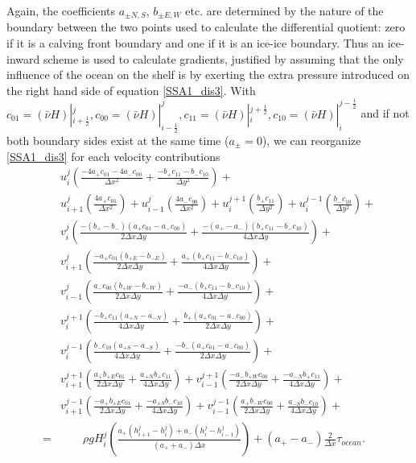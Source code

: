 \documentclass[a4paper,10pt]{article}
\begin{document}
Again, the coefficients $a_{\pm N,S}$, $b_{\pm E,W}$ etc. are determined by the nature of the boundary between the two points used to calculate the differential quotient: zero if it is a calving front boundary and one if it is an ice-ice boundary. Thus an ice-inward scheme is used to calculate gradients, justified by assuming that the only influence of the ocean on the shelf is by exerting the extra pressure introduced on the right hand side of equation \eqref{SSA1_dis3}.\newline
\newline
With $c_{01}=(\bar{\nu}H)|_{i+\frac{1}{2}}^j, c_{00}=(\bar{\nu}H)|_{i-\frac{1}{2}}^j, c_{11}=(\bar{\nu}H)|_{i}^{j+\frac{1}{2}}, c_{10}=(\bar{\nu}H)|_{i}^{j-\frac{1}{2}}$ and if not both boundary sides exist at the same time ($a_{\pm}=0$), we can reorganize \eqref{SSA1_dis3} for each velocity contributions
\begin{align}
& u_{i}^{j}\left(\frac{-4a_+c_{01}-4a_-c_{00}}{\Delta x^2}+\frac{-b_+c_{11}-b_-c_{10}}{\Delta y^2}\right)+ \nonumber \\
& u_{i+1}^{j}\left(\frac{4a_+c_{01}}{\Delta x^2}\right)+u_{i-1}^{j}\left(\frac{4a_-c_{00}}{\Delta x^2}\right)+u_{i}^{j+1}\left(\frac{b_+c_{11}}{\Delta y^2}\right)+u_{i}^{j-1}\left(\frac{b_-c_{10}}{\Delta y^2}\right)+ \nonumber \\
& v_{i}^{j}\left(\frac{-(b_+-b_-)(a_+ c_{01}-a_- c_{00})}{2 \Delta x \Delta y}+\frac{-(a_+-a_-)(b_+ c_{11}-b_- c_{10})}{4 \Delta x \Delta y}\right)+ \nonumber \\
& v_{i+1}^{j}\left(\frac{-a_+ c_{01} (b_{+E}-b_{-E})}{2 \Delta x \Delta y}+\frac{a_+ (b_{+}c_{11}-b_{-}c_{10})}{4 \Delta x \Delta y}\right)+ \nonumber \\
& v_{i-1}^{j}\left(\frac{a_- c_{00} (b_{+W}-b_{-W})}{2 \Delta x \Delta y}+\frac{-a_-(b_{+}c_{11}-b_{-}c_{10})}{4 \Delta x \Delta y}\right)+ \nonumber \\
& v_{i}^{j+1}\left(\frac{-b_+ c_{11} (a_{+N}-a_{-N})}{4 \Delta x \Delta y}+\frac{b_+(a_{+}c_{01}-a_{-}c_{00})}{2 \Delta x \Delta y}\right)+ \nonumber \\
& v_{i}^{j-1}\left(\frac{b_- c_{10} (a_{+S}-a_{-S})}{4 \Delta x \Delta y}+\frac{-b_-(a_{+}c_{01}-a_{-}c_{00})}{2 \Delta x \Delta y}\right)+ \nonumber \\
& v_{i+1}^{j+1}\left(\frac{a_+ b_{+E} c_{01}}{2 \Delta x \Delta y}+\frac{a_{+N} b_{+} c_{11}}{4 \Delta x \Delta y}\right)+ v_{i-1}^{j+1}\left(\frac{-a_- b_{+W} c_{00}}{2 \Delta x \Delta y}+\frac{-a_{-N} b_{+} c_{11}}{4 \Delta x \Delta y}\right)+ \nonumber \\
& v_{i+1}^{j-1}\left(\frac{-a_+ b_{+E} c_{01}}{2 \Delta x \Delta y}+\frac{-a_{+S} b_{-} c_{10}}{4 \Delta x \Delta y}\right)+ v_{i-1}^{j-1}\left(\frac{a_+ b_{-W} c_{00}}{2 \Delta x \Delta y}+\frac{a_{-S} b_{-} c_{10}}{4 \Delta x \Delta y}\right)+ \nonumber \\
= &\qquad \rho gH_{i}^{j} \left(\frac{a_+(h_{i+1}^{j}-h_{i}^{j})+a_-(h_{i}^{j}-h_{i-1}^{j})}{(a_++a_-)\Delta x}\right) + (a_+ - a_-)\frac{2}{\Delta x}\tau_{ocean}. \label{SSA1_dis4}
\end{align}
\end{document}
